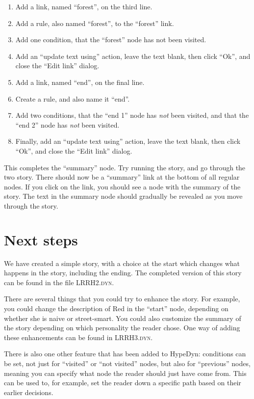 \documentclass{article}
\begin{document}
\begin{enumerate}
  \item Add a link, named ``forest'', on the third line.
  \item Add a rule, also named ``forest'', to the ``forest'' link.
  \item Add one condition, that the ``forest'' node has not been visited.
  \item Add an ``update text using'' action, leave the text blank, then click
  ``Ok'', and close the ``Edit link'' dialog.
  \item Add a link, named ``end'', on the final line.
  \item Create a rule, and also name it ``end''.
  \item Add two conditions, that the ``end 1'' node has \textit{not} been
  visited, and that the ``end 2'' node has \textit{not} been visited.
  \item Finally, add an ``update text using'' action, leave the text blank,
  then click ``Ok'', and close the ``Edit link'' dialog.
\end{enumerate}

This completes the ``summary'' node. Try running the story, and go through
the two story. There should now be a ``summary'' link at the bottom of all
regular nodes. If you click on the link, you should see a node with the summary
of the story. The text in the summary node should gradually be revealed as you
move through the story.

\section{Next steps}

We have created a simple story, with a choice at the start which changes what
happens in the story, including the ending. The completed version of this story
can be found in the file \textsc{LRRH2.dyn}.

There are several things that you could try to enhance the story. For example,
you could change the description of Red in the ``start'' node, depending on
whether she is naive or street-smart. You could also customize the summary of
the story depending on which personality the reader chose. One way of adding
these enhancements can be found in \textsc{LRRH3.dyn}.

There is also one other feature that has been added to HypeDyn: conditions can be
set, not just for ``visited'' or ``not visited'' nodes, but also for ``previous''
nodes, meaning you can specify what node the reader should just have come from.
This can be used to, for example, set the reader down a specific path based on
their earlier decisions.
\end{document}

